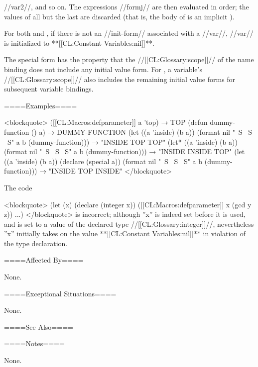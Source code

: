 //var2//, and so on. The expressions //formj// are then evaluated in order; the values of all but the last are discarded (that is, the body of  is an implicit ).

For both  and , if there is not an //init-form// associated with a //var//, //var// is initialized to **[[CL:Constant Variables:nil]]**.

The special form  has the property that the //[[CL:Glossary:scope]]// of the name binding does not include any initial value form. For , a variable's //[[CL:Glossary:scope]]// also includes the remaining initial value forms for subsequent variable bindings.

====Examples====

<blockquote> ([[CL:Macros:defparameter]] a 'top) → TOP (defun dummy-function () a) → DUMMY-FUNCTION (let ((a 'inside) (b a)) (format nil "~S ~S ~S" a b (dummy-function))) → "INSIDE TOP TOP" (let* ((a 'inside) (b a)) (format nil "~S ~S ~S" a b (dummy-function))) → "INSIDE INSIDE TOP" (let ((a 'inside) (b a)) (declare (special a)) (format nil "~S ~S ~S" a b (dummy-function))) → "INSIDE TOP INSIDE" </blockquote>

\medbreak The code

<blockquote> (let (x) (declare (integer x)) ([[CL:Macros:defparameter]] x (gcd y z)) ...) </blockquote> is incorrect; although ''x'' is indeed set before it is used, and is set to a value of the declared type //[[CL:Glossary:integer]]//, nevertheless ''x'' initially takes on the value **[[CL:Constant Variables:nil]]** in violation of the type declaration.

====Affected By====

None.

====Exceptional Situations====

None.

====See Also====


====Notes====

None.

   
